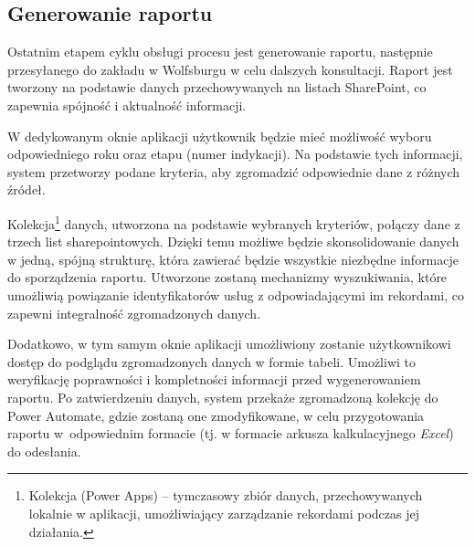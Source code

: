 \subsection{Generowanie raportu}
Ostatnim etapem cyklu obsługi procesu jest generowanie raportu, następnie przesyłanego do zakładu w Wolfsburgu w celu dalszych konsultacji. Raport jest tworzony na podstawie danych przechowywanych na listach SharePoint, co zapewnia spójność i aktualność informacji.

W dedykowanym oknie aplikacji użytkownik będzie mieć możliwość wyboru odpowiedniego roku oraz etapu (numer indykacji). Na podstawie tych informacji, system przetworzy podane kryteria, aby zgromadzić odpowiednie dane z różnych źródeł.

Kolekcja\footnote{Kolekcja (Power Apps) -- tymczasowy zbiór danych, przechowywanych lokalnie w aplikacji, umożliwiający zarządzanie rekordami podczas jej działania.} danych, utworzona na podstawie wybranych kryteriów, połączy dane z trzech list sharepointowych. Dzięki temu możliwe będzie skonsolidowanie danych w jedną, spójną strukturę, która zawierać będzie wszystkie niezbędne informacje do sporządzenia raportu. Utworzone zostaną mechanizmy wyszukiwania, które umożliwią powiązanie identyfikatorów usług z odpowiadającymi im rekordami, co zapewni integralność zgromadzonych danych.

Dodatkowo, w tym samym oknie aplikacji umożliwiony zostanie użytkownikowi dostęp do podglądu zgromadzonych danych w formie tabeli. Umożliwi to weryfikację poprawności i kompletności informacji przed wygenerowaniem raportu. Po zatwierdzeniu danych, system przekaże zgromadzoną kolekcję do Power Automate, gdzie zostaną one zmodyfikowane, w celu przygotowania raportu w~odpowiednim formacie (tj. w formacie arkusza kalkulacyjnego \emph{Excel}) do odesłania.

